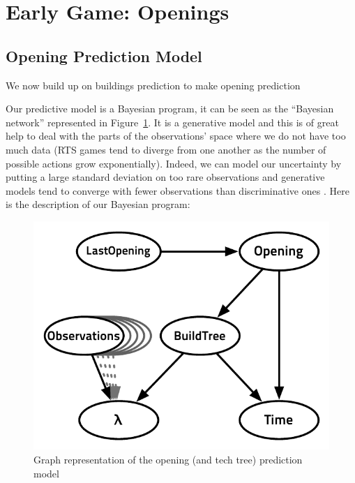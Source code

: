 \section{Early Game: Openings}

\subsection{Opening Prediction Model}
We now build up on buildings prediction to make opening prediction %

Our predictive model is a Bayesian program, it can be seen as the ``Bayesian network'' represented in Figure~\ref{BNPrediction}. It is a generative model and this is of great help to deal with the parts of the observations' space where we do not have too much data (RTS games tend to diverge from one another as the number of possible actions grow exponentially). Indeed, we can model our uncertainty by putting a large standard deviation on too rare observations and generative models tend to converge with fewer observations than discriminative ones \citep{Jordan}. Here is the description of our Bayesian program:

\begin{figure}[htp]
\centerline{\includegraphics[width=0.4\columnwidth]{images/OpeningPrediction2.pdf}}
\caption{Graph representation of the opening (and tech tree) prediction model}
\label{BNPrediction}
\end{figure}

